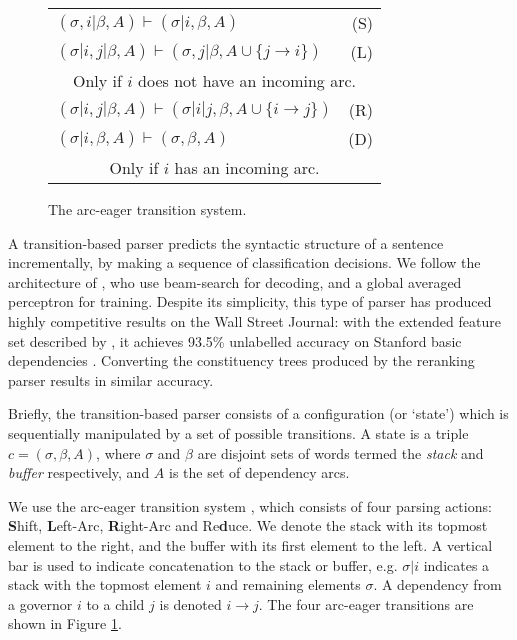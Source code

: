 \documentclass[11pt,letterpaper]{article}
\begin{document}
\begin{figure}
    \centering
    \begin{tabular}{lr}
        $(\sigma,i | \beta, A) \vdash (\sigma | i, \beta, A) $ \hfill & \hfill (S) \\
        $(\sigma | i,j | \beta, A) \vdash ( \sigma, j | \beta, A \cup \{ j \rightarrow i \} ) $ \hfill & \hfill (L) \\
        \multicolumn{2}{c}{Only if $i$ does not have an incoming arc.}\\
        $(\sigma | i,j | \beta, A) \vdash ( \sigma | i | j, \beta, A \cup \{ i \rightarrow j \} ) $ \hfill & \hfill (R) \\
        $(\sigma | i, \beta, A) \vdash ( \sigma, \beta, A )$ \hfill & \hfill  (D) \\
        \multicolumn{2}{c}{Only if $i$ has an incoming arc.}\\


    \end{tabular}
    \caption{\small The arc-eager transition system.\label{fig:ae_notation}}
\end{figure}


A transition-based parser predicts the syntactic structure of a sentence incrementally,
by making a sequence of classification decisions.  We follow the architecture of
\citet{zhang:cl11}, who use beam-search for decoding, and a global averaged
perceptron for training.  Despite its simplicity, this type of parser
has produced highly competitive results on the Wall Street Journal: with the
extended feature set described by \citet{zhang:11}, it achieves 93.5\%
unlabelled accuracy on Stanford basic dependencies \citep{stanford_deps}.  Converting
the constituency trees produced by the \citet{Charniak05a} reranking parser
results in similar accuracy.

Briefly, the transition-based parser consists of a configuration (or `state') which
is sequentially
manipulated by a set of possible transitions.  A state is a triple
$c = (\sigma, \beta, A)$, where
$\sigma$ and $\beta$ are disjoint sets of words termed the \emph{stack} and
\emph{buffer} respectively, and $A$ is the set of dependency arcs.

We use the arc-eager transition system \citep{nivre:03,nivre:cl}, which consists
of four parsing actions:  \textbf{S}hift, \textbf{L}eft-Arc,
\textbf{R}ight-Arc and Re\textbf{d}uce.
We denote the stack with its topmost element
to the right, and the buffer with its first element to the left. A vertical bar
is used to indicate concatenation to the stack or buffer, e.g. $\sigma | i$ indicates
a stack with the topmost element $i$ and remaining elements $\sigma$.  
A dependency from a governor $i$ to a child $j$ is denoted $i \rightarrow j$.
The four arc-eager transitions are shown in Figure \ref{fig:ae_notation}.
\end{document}
